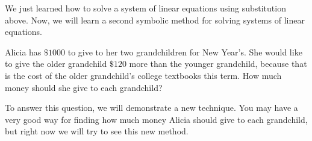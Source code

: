 \documentclass[nooutcomes]{ximera}
\begin{document}
 We just  learned how to solve a system of linear equations using substitution above. Now, 
      we will learn a second symbolic method for solving systems of linear equations.
\begin{example}
 Alicia has $\$1000$ to give to her two grandchildren for New Year's.
        She would like to give the older grandchild $\$120$ more than the younger grandchild,
        because that is the cost of the older grandchild's college textbooks this term.
        How much money should she give to each grandchild?

\begin{explanation}
    To answer this question, we will demonstrate a new technique.
        You may have a very good way for finding how much money Alicia should give to each grandchild,
        but right now we will try to see this new method.


\end{explanation}
\end{example}
\end{document}
